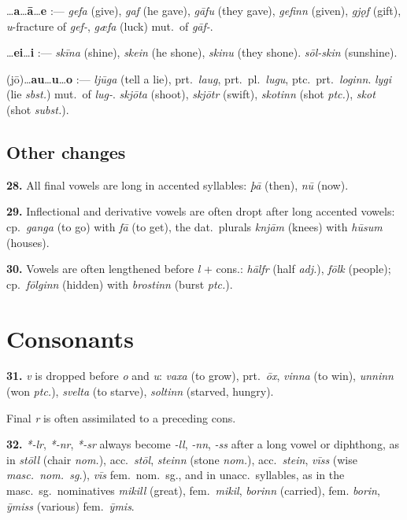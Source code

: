 \documentclass[12pt,letterpaper]{book}
\newcommand{\gap}[1][.25in]{\hspace{#1}}
\begin{document}
\gap{\bf e}\ldots {\bf a}\ldots {\bf ā}\ldots {\bf e} :--- \textit{gefa} (give),
\textit{gaf} (he gave), \textit{gāfu} (they gave), \textit{gefinn} (given),
\textit{gjǫf} (gift), \textit{u}-fracture of \textit{gef-}, \textit{gæfa} (luck)
mut.\ of \textit{gāf-}.

\gap{\bf ī}\ldots {\bf ei}\ldots {\bf i} :--- \textit{skīna} (shine), \textit{skein}
(he shone), \textit{skinu} (they shone).  \textit{sōl-skin} (sunshine).

\gap{\bf jū} (jō)\ldots {\bf au}\ldots {\bf u}\ldots {\bf o} :--- \textit{ljūga}
(tell a lie), prt.\ \textit{laug}, prt.\ pl.\ \textit{lugu},
ptc.\ prt.\ \textit{loginn}.  \textit{lygi} (lie \textit{sbst.}) mut.\ of \textit{lug-}.
\textit{skjōta} (shoot), \textit{skjōtr} (swift), \textit{skotinn} (shot
\textit{ptc.}), \textit{skot} (shot \textit{subst.}).

\subsection{Other changes}

\textbf{28.} All final vowels are long in accented syllables: \textit{þā} (then),
\textit{nū} (now).

\textbf{29.} Inflectional and derivative vowels are often dropt after long
accented vowels: cp.\ \textit{ganga} (to go) with \textit{fā} (to get), the
dat.\ plurals \textit{knjām} (knees) with \textit{hūsum} (houses).

\textbf{30.} Vowels are often lengthened before \textit{l} + cons.: \textit{hālfr}
(half \textit{adj.}), \textit{fōlk} (people); cp.\ \textit{fōlginn} (hidden)
with \textit{brostinn} (burst \textit{ptc.}).

\section{Consonants}

\textbf{31.} \textit{v} is dropped before \textit{o} and \textit{u}: \textit{vaxa}
(to grow), prt.\ \textit{ōx}, \textit{vinna} (to win), \textit{unninn}
(won \textit{ptc.}), \textit{svelta} (to starve), \textit{soltinn}
(starved, hungry).

Final \textit{r} is often assimilated to a preceding cons.

\textbf{32.} \textit{*-lr}, \textit{*-nr}, \textit{*-sr} always become \textit{-ll},
\textit{-nn}, \textit{-ss} after a long vowel or diphthong, as in \textit{stōll}
(chair \textit{nom.}), acc.\ \textit{stōl}, \textit{steinn} (stone \textit{nom.}),
acc.\ \textit{stein}, \textit{vīss} (wise \textit{masc.\ nom.\ sg.}), \textit{vīs}
fem.\ nom.\ sg., and in unacc.\ syllables, as in the masc.\ sg.\ nominatives
\textit{mikill} (great), fem.\ \textit{mikil}, \textit{borinn} (carried), fem.
\textit{borin}, \textit{ȳmiss} (various) fem.\ \textit{ȳmis}.
\end{document}
